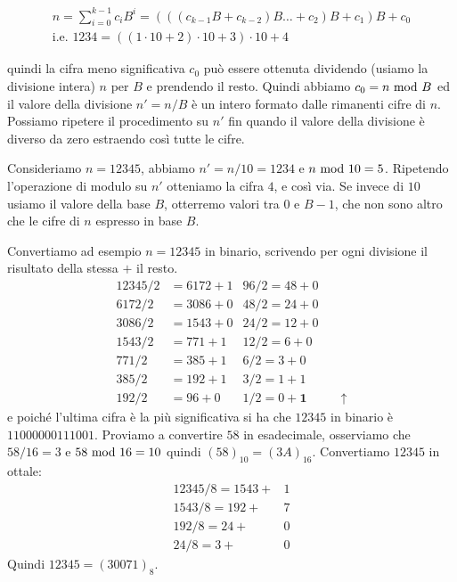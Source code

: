 \begin{align*}
n = \sum_{i=0}^{k-1} c_iB^i = (((c_{k-1}B+c_{k-2})B\ldots+ c_2)B + c_1)B + c_0\\
\text{i.e. } 1234 = ((1\cdot{10}+2)\cdot{10}+3)\cdot{10} + 4
\end{align*}


\noindent quindi la cifra meno significativa $c_0$ può essere ottenuta
dividendo (usiamo la divisione intera) $n$ per $B$ e prendendo il resto.
 Quindi abbiamo $c_0 = n \ \text{mod}\ B$ ed il valore della divisione $n' = n /
B$ è un intero formato dalle rimanenti cifre di $n$. Possiamo ripetere il
procedimento su $n'$ fin quando il valore della divisione è diverso da zero estraendo così tutte le cifre.

\begin{ex}
Consideriamo $n = 12345$, abbiamo $n' = n/10 = 1234$ e $n \ \text{mod}\ 10 = 5$. Ripetendo l'operazione di modulo su $n'$ otteniamo la cifra $4$, e così via. Se
invece di $10$ usiamo il valore della base $B$, otterremo valori tra $0$ e $B-1$, che non sono altro che le cifre di $n$ espresso in base $B$.

Convertiamo ad esempio $n = 12345$ in binario, scrivendo per ogni divisione il risultato della stessa $+$ il resto.
\begin{align*}
 12345 / 2 &= 6172 + 1   &96 / 2 = 48 + 0\\
 6172  / 2 &= 3086 + 0   &48 / 2 = 24 + 0\\
 3086  / 2 &= 1543 + 0   &24 / 2 = 12 + 0\\
 1543  / 2 &= 771 + 1    &12 / 2 = 6 + 0\\
 771   / 2 &= 385 + 1    &6 / 2  = 3 + 0\\
 385   / 2 &= 192 + 1    &3 / 2  = 1 + 1\\
 192   / 2 &= 96 + 0     &1 / 2  = 0 + \mathbf{1}& \quad \uparrow
\end{align*}
e poiché l'ultima cifra è la più significativa si ha che $12345$ in binario è $11000000111001$. Proviamo a convertire $58$ in esadecimale, osserviamo che $58/16 = 3$ e $58 \ \text{mod}\ 16 = 10$ quindi $(58)_{10} = (3A)_{16}$. Convertiamo $12345$ in ottale:
\begin{align*}
 12345 / 8 = 1543 + &1 \\
 1543  / 8 = 192 + &7   \\
 192  / 8  = 24 + &0 \\
 24  / 8   = 3 + &0
\end{align*}
\noindent Quindi $12345 = (30071)_8$.
\end{ex}


